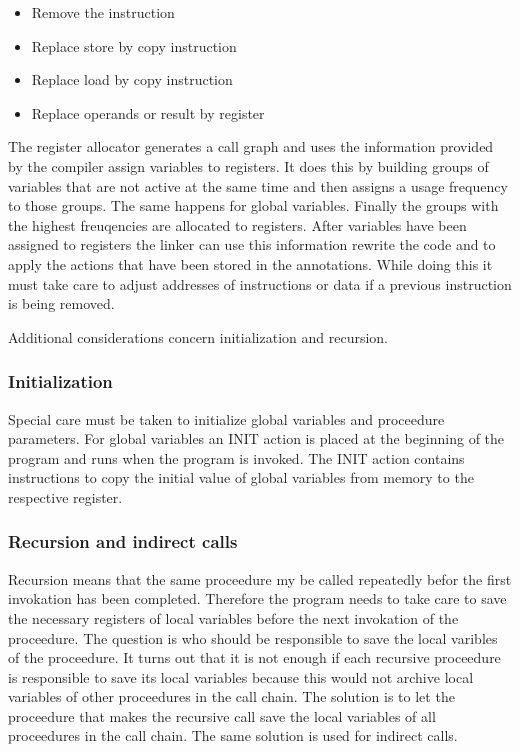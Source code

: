 \documentclass[a4paper,10pt]{article}
\begin{document}
\begin{itemize}
 \item {} Remove the instruction
 \item {}  Replace store by copy instruction 
 \item {}   Replace load by copy instruction
 \item {} Replace operands or result by register
\end{itemize}

The register allocator generates a call graph and uses the information provided by the compiler assign variables to registers. It does 
this by building groups of variables that are not active at the same time and then assigns a usage frequency to those groups. The same 
happens for global variables. Finally the groups with the highest freuqencies are allocated to registers. After variables have been 
assigned to registers the linker can use this information rewrite the code and to apply the actions that have been stored in the 
annotations. While doing this it must take care to adjust addresses of instructions or data if a previous instruction is being removed.

Additional considerations concern initialization and recursion.

\subsubsection*{Initialization}
Special care must be taken to initialize global variables and proceedure parameters. For global variables an INIT action is placed at the
beginning of the program and runs when the program is invoked. The INIT action contains instructions to copy the initial value of global 
variables from memory to the respective register.

\subsubsection*{Recursion and indirect calls}
Recursion means that the same proceedure my be called repeatedly befor the first invokation has been completed. Therefore the program
needs to take care to save the necessary registers of local variables before the next invokation of the proceedure. The question is who 
should be responsible to save the local varibles of the proceedure. It turns out that it is not enough if each recursive proceedure is 
responsible to save its local variables because this would not archive local variables of other proceedures in the call chain. The 
solution is to let the proceedure that makes the recursive call save the local variables of all proceedures in the call chain. The same 
solution is used for indirect calls.
\end{document}

